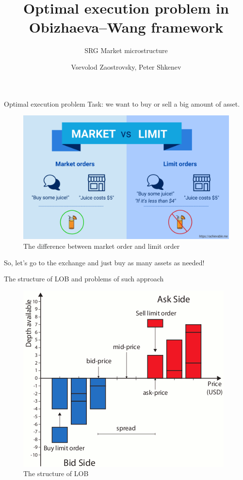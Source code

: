 \documentclass[aspectratio=169]{beamer}
\title{Optimal execution problem in Obizhaeva--Wang framework}
\subtitle{SRG Market microstructure}
\author{Vsevolod Zaostrovsky, Peter Shkenev}
\institute{Vega Institute Foundation}
\begin{document}
\maketitle

\begin{frame}{Optimal execution problem}
    Task: we want to buy or sell a big amount of asset. \par
    \begin{figure}
        \includegraphics[scale=0.23]{figs/market-vs-limit-1024x614.png}
        \caption{The difference between market order and limit order}
        \label{fig:mvslim}
    \end{figure}
    So, let's go to the exchange and just buy as many assets as needed!

\end{frame}

\begin{frame}{The structure of LOB and problems of such approach}
    \begin{figure}
        \includegraphics[scale=0.45]{figs/Graphical-representation-of-the-Limit-Order-Book.png}
        \caption{The structure of LOB}
        \label{fig:mvslim}
    \end{figure}

\end{frame}
\end{document}
